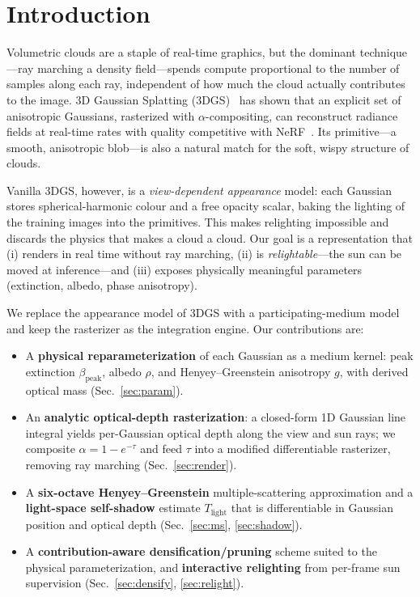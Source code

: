 \documentclass[sigconf]{acmart}
\newcommand{\bpeak}{\beta_{\mathrm{peak}}}
\newcommand{\Tlight}{T_{\mathrm{light}}}
\begin{document}
\section{Introduction}
\label{sec:intro}

Volumetric clouds are a staple of real-time graphics, but the dominant
technique---ray marching a density field---spends compute proportional to the
number of samples along each ray, independent of how much the cloud actually
contributes to the image. 3D Gaussian Splatting (3DGS)~\cite{kerbl3Dgaussians}
has shown that an explicit set of anisotropic Gaussians, rasterized with
$\alpha$-compositing, can reconstruct radiance fields at real-time rates with
quality competitive with NeRF~\cite{mildenhall2020nerf}. Its primitive---a
smooth, anisotropic blob---is also a natural match for the soft, wispy
structure of clouds.

Vanilla 3DGS, however, is a \emph{view-dependent appearance} model: each
Gaussian stores spherical-harmonic colour and a free opacity scalar, baking
the lighting of the training images into the primitives. This makes relighting
impossible and discards the physics that makes a cloud a cloud. Our goal is a
representation that (i) renders in real time without ray marching, (ii) is
\emph{relightable}---the sun can be moved at inference---and (iii) exposes
physically meaningful parameters (extinction, albedo, phase anisotropy).

We replace the appearance model of 3DGS with a participating-medium model and
keep the rasterizer as the integration engine. Our contributions are:

\begin{itemize}
  \item A \textbf{physical reparameterization} of each Gaussian as a medium
        kernel: peak extinction $\bpeak$, albedo $\rho$, and
        Henyey--Greenstein anisotropy $g$, with derived optical mass
        (Sec.~\ref{sec:param}).
  \item An \textbf{analytic optical-depth rasterization}: a closed-form 1D
        Gaussian line integral yields per-Gaussian optical depth along the view
        and sun rays; we composite $\alpha=1-e^{-\tau}$ and feed $\tau$ into a
        modified differentiable rasterizer, removing ray marching
        (Sec.~\ref{sec:render}).
  \item A \textbf{six-octave Henyey--Greenstein} multiple-scattering
        approximation and a \textbf{light-space self-shadow} estimate
        $\Tlight$ that is differentiable in Gaussian position and optical depth
        (Sec.~\ref{sec:ms}, \ref{sec:shadow}).
  \item A \textbf{contribution-aware densification/pruning} scheme suited to
        the physical parameterization, and \textbf{interactive relighting} from
        per-frame sun supervision (Sec.~\ref{sec:densify}, \ref{sec:relight}).
\end{itemize}
\end{document}
